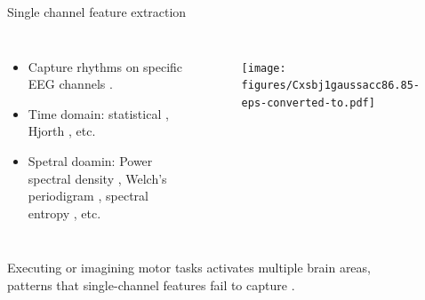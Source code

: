 \documentclass[aspectratio=169]{beamer}
\let\oldcite\cite %
\renewcommand{\cite}[1]{{\tiny\oldcite{#1}}}
\begin{document}
\begin{frame}{Single channel feature extraction}
    \begin{columns}
            \begin{itemize}
                \item Capture rhythms on specific EEG channels \cite{samuel2017towards}.
                \item Time domain: statistical \cite{hamedi2014neural}, Hjorth \cite{yilmaz2018quasi}, etc.
                \item Spetral doamin: Power spectral density \cite{oikonomou2017comparison}, Welch's periodigram \cite{roy2022comparative}, spectral entropy \cite{sarraf2017eeg}, etc.
            \end{itemize}
            \begin{figure}[!ht]
                \centering
                \texttt{[image: figures/Cxsbj1gaussacc86.85-eps-converted-to.pdf]}
            \end{figure}
    \end{columns}
    \vspace{3em}
    \centering
    Executing or imagining motor tasks activates multiple brain areas,\\patterns that single-channel features fail to capture \cite{chiarion2023connectivity}.
\end{frame}
\end{document}
